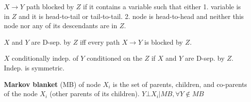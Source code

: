 $X \rightarrow Y$ path blocked by $Z$ if it contains a variable such that either
1. variable is in $Z$ and it is head-to-tail or tail-to-tail.
2. node is head-to-head and neither this node nor any of its descendants are in $Z$.

$X$ and $Y$ are D-sep. by $Z$ iff every path $X \rightarrow Y$ is blocked by $Z$.

$X$ conditionally indep. of $Y$ conditioned on the $Z$ if $X$ and $Y$ are D-sep. by $Z$. Indep. is symmetric.

\textbf{Markov blanket} (MB) of node $X_i$ is the set of parents, children, and co-parents of the node $X_i$ (other parents of its children). $Y \bot X_i | MB, \forall Y \notin MB$
